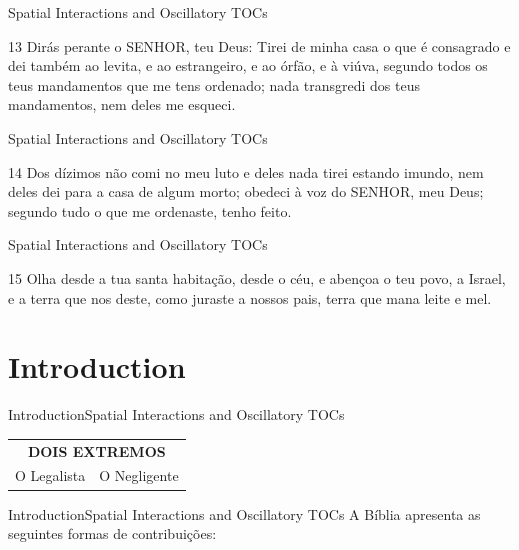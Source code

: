 \documentclass[14pt,aspectratio=169]{beamer}
\newcommand{\TT}{Spatial Interactions and Oscillatory TOCs}
\newcommand{\IN}{Introduction}
\begin{document}
\begin{frame}{\TB}{\TT}
 \begin{block}{\DT}
 \Large
13 Dirás perante o SENHOR, teu Deus: Tirei de minha casa o que é consagrado e dei também ao levita, e ao estrangeiro, e ao órfão, e à viúva, segundo todos os teus mandamentos que me tens ordenado; nada transgredi dos teus mandamentos, nem deles me esqueci.
 \end{block}
\end{frame}

\begin{frame}{\TB}{\TT}
 \begin{block}{\DT}
 \Large
14 Dos dízimos não comi no meu luto e deles nada tirei estando imundo, nem deles dei para a casa de algum morto; obedeci à voz do SENHOR, meu Deus; segundo tudo o que me ordenaste, tenho feito.
 \end{block}
\end{frame}

\begin{frame}{\TB}{\TT}
 \begin{block}{\DT}
15 Olha desde a tua santa habitação, desde o céu, e abençoa o teu povo, a Israel, e a terra que nos deste, como juraste a nossos pais, terra que mana leite e mel. 
 \end{block}
\end{frame}

\begin{frame}
 \tableofcontents
\end{frame}

\section{\IN}
\begin{frame}{\IN}{\TT}
 \begin{table}
  \begin{center}
   \begin{tabular}{lr}
   \multicolumn{2}{c}{\textbf{DOIS EXTREMOS}}\\ \pause
   O Legalista \pause & O Negligente    
   \end{tabular}
  \end{center}
 \end{table}
\end{frame}

\begin{frame}{\IN}{\TT}
 A Bíblia apresenta as seguintes formas de contribuições:
\end{frame}
\end{document}
